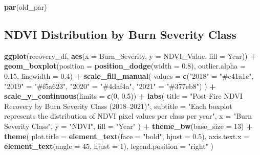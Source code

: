 \documentclass[
]{article}
\newenvironment{Shaded}{\begin{snugshade}}{\end{snugshade}}
\newcommand{\AttributeTok}[1]{\textcolor[rgb]{0.13,0.29,0.53}{#1}}
\newcommand{\DecValTok}[1]{\textcolor[rgb]{0.00,0.00,0.81}{#1}}
\newcommand{\FloatTok}[1]{\textcolor[rgb]{0.00,0.00,0.81}{#1}}
\newcommand{\FunctionTok}[1]{\textcolor[rgb]{0.13,0.29,0.53}{\textbf{#1}}}
\newcommand{\NormalTok}[1]{#1}
\newcommand{\OtherTok}[1]{\textcolor[rgb]{0.56,0.35,0.01}{#1}}
\newcommand{\SpecialCharTok}[1]{\textcolor[rgb]{0.81,0.36,0.00}{\textbf{#1}}}
\newcommand{\StringTok}[1]{\textcolor[rgb]{0.31,0.60,0.02}{#1}}
\begin{document}
\begin{Shaded}
\begin{Highlighting}[]
\FunctionTok{par}\NormalTok{(old\_par)}
\end{Highlighting}
\end{Shaded}

\subsection{NDVI Distribution by Burn Severity
Class}\label{ndvi-distribution-by-burn-severity-class}

\begin{Shaded}
\begin{Highlighting}[]
\FunctionTok{ggplot}\NormalTok{(recovery\_df, }\FunctionTok{aes}\NormalTok{(}\AttributeTok{x =}\NormalTok{ Burn\_Severity, }\AttributeTok{y =}\NormalTok{ NDVI\_Value, }\AttributeTok{fill =}\NormalTok{ Year)) }\SpecialCharTok{+}
  \FunctionTok{geom\_boxplot}\NormalTok{(}\AttributeTok{position    =} \FunctionTok{position\_dodge}\NormalTok{(}\AttributeTok{width =} \FloatTok{0.8}\NormalTok{),}
               \AttributeTok{outlier.alpha =} \FloatTok{0.15}\NormalTok{,}
               \AttributeTok{linewidth     =} \FloatTok{0.4}\NormalTok{) }\SpecialCharTok{+}
  \FunctionTok{scale\_fill\_manual}\NormalTok{(}
    \AttributeTok{values =} \FunctionTok{c}\NormalTok{(}\StringTok{"2018"} \OtherTok{=} \StringTok{"\#e41a1c"}\NormalTok{,}
               \StringTok{"2019"} \OtherTok{=} \StringTok{"\#f5a623"}\NormalTok{,}
               \StringTok{"2020"} \OtherTok{=} \StringTok{"\#4daf4a"}\NormalTok{,}
               \StringTok{"2021"} \OtherTok{=} \StringTok{"\#377eb8"}\NormalTok{)}
\NormalTok{  ) }\SpecialCharTok{+}
  \FunctionTok{scale\_y\_continuous}\NormalTok{(}\AttributeTok{limits =} \FunctionTok{c}\NormalTok{(}\DecValTok{0}\NormalTok{, }\FloatTok{0.5}\NormalTok{)) }\SpecialCharTok{+}
  \FunctionTok{labs}\NormalTok{(}
    \AttributeTok{title    =} \StringTok{"Post{-}Fire NDVI Recovery by Burn Severity Class (2018–2021)"}\NormalTok{,}
    \AttributeTok{subtitle =} \StringTok{"Each boxplot represents the distribution of NDVI pixel values per class per year"}\NormalTok{,}
    \AttributeTok{x        =} \StringTok{"Burn Severity Class"}\NormalTok{,}
    \AttributeTok{y        =} \StringTok{"NDVI"}\NormalTok{,}
    \AttributeTok{fill     =} \StringTok{"Year"}
\NormalTok{  ) }\SpecialCharTok{+}
  \FunctionTok{theme\_bw}\NormalTok{(}\AttributeTok{base\_size =} \DecValTok{13}\NormalTok{) }\SpecialCharTok{+}
  \FunctionTok{theme}\NormalTok{(}
    \AttributeTok{plot.title      =} \FunctionTok{element\_text}\NormalTok{(}\AttributeTok{face =} \StringTok{"bold"}\NormalTok{, }\AttributeTok{hjust =} \FloatTok{0.5}\NormalTok{),}
    \AttributeTok{axis.text.x     =} \FunctionTok{element\_text}\NormalTok{(}\AttributeTok{angle =} \DecValTok{45}\NormalTok{, }\AttributeTok{hjust =} \DecValTok{1}\NormalTok{),}
    \AttributeTok{legend.position =} \StringTok{"right"}
\NormalTok{  )}
\end{Highlighting}
\end{Shaded}
\end{document}
